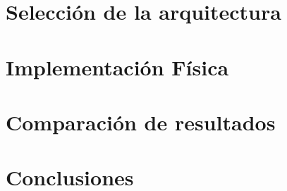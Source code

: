 \documentclass[twoside,12pt, pdftex]{classes/CUEDthesisPSnPDF}
\begin{document}
\sloppy

\maketitle
%

\tableofcontents			%
\listoffigures 
\listoftables 

\mainmatter

\part{Selección de la arquitectura}\label{seleccion_arquitectura}


\part{Implementación Física}\label{implementacion_fisica}


\part{Comparación de resultados}\label{comparacion_resultados}

\part{Conclusiones}

\appendix


%
\backmatter


\pagestyle{fancyplain}                                                            %
\renewcommand{\partname}{PARTE}
\renewcommand{\chaptermark}[1]{\markboth{\textbf{\small{CAPÍTULO \thechapter}}}{}}%
\renewcommand{\sectionmark}[1]{\markright{\textbf{\small{\thesection. #1}}}}      %






\end{document}
